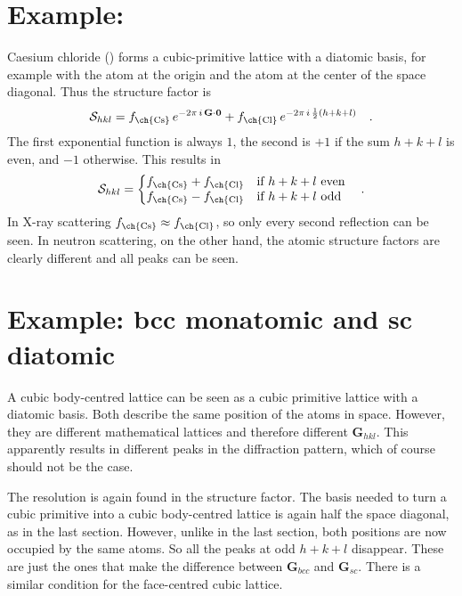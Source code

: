 \section{Example: }

Caesium chloride () forms a cubic-primitive lattice with a diatomic basis, for example with the  atom at the origin and the  atom at the center of the space diagonal. Thus the structure factor is 
\begin{equation}
\mathcal{S}_{hkl} = f_\text{\ch{Cs}} \, e^{-2 \pi \, i \, \mathbf{G} \cdot \mathbf{0}} + f_\text{\ch{Cl}} \, e^{- 2 \pi \, i \, \frac{1}{2}(h + k + l) }   \quad .
\end{equation}
The first exponential function is always $1$, the second is $+1$ if the sum $h + k + l$ is even, and $-1$ otherwise. This results in
\begin{equation}
  \mathcal{S}_{hkl} = \left\{
  \begin{array}{@{}ll@{}}
    f_\text{\ch{Cs}}  + f_\text{\ch{Cl}}  &\text{if}\ h+k+l \ \text{even} \\
     f_\text{\ch{Cs}}  - f_\text{\ch{Cl}} & \text{if}\ h+k+l \ \text{odd} \\
  \end{array}\right.  \quad .
\end{equation} 
In X-ray scattering $f_\text{\ch{Cs}}  \approx f_\text{\ch{Cl}}$, so only every second reflection can be seen. In neutron scattering, on the other hand, the atomic structure factors are clearly different and all peaks can be seen.



\section{Example: bcc monatomic and sc diatomic}

A cubic body-centred lattice can be seen as a cubic primitive lattice with a diatomic basis. Both describe the same position of the atoms in space. However, they are different mathematical lattices and therefore different $\mathbf{G}_{hkl}$. This apparently results in different peaks in the diffraction pattern, which of course should not be the case.

The resolution is again found in the structure factor. The basis needed to turn a cubic primitive into a cubic body-centred lattice is again half the space diagonal, as in the last section. However, unlike in the last section, both positions are now occupied by the same atoms. So all the peaks at odd $ h+k+l $ disappear. These are just the ones that make the difference between $\mathbf{G}_{bcc} $ and $\mathbf{G}_{sc} $. There is a similar condition for the face-centred cubic lattice.


